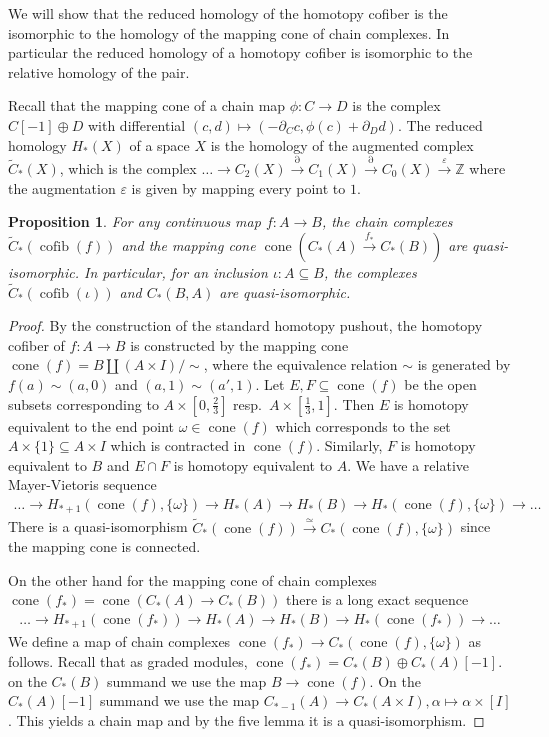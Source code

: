 \documentclass{scrartcl}
\theoremstyle{plain}
\newtheorem{proposition}[theorem]{Proposition}
\theoremstyle{definition}
\newcommand{\Z}{\mathbb Z}
\renewcommand{\epsilon}{\varepsilon}
\renewcommand{\subset}{\subseteq}
\newcommand{\isect}{\mathbin{\cap}}
\DeclareMathOperator{\cone}{cone}
\DeclareMathOperator{\cofib}{cofib}
\newcommand{\quiso}{\simeq}
\let\xto\xrightarrow
\renewcommand{\coprod}{\mathbin{\amalg}}
\begin{document}
We will show that the reduced homology of the homotopy cofiber is the isomorphic to the homology of the mapping cone of chain complexes. In particular the reduced homology of a homotopy cofiber is isomorphic to the relative homology of the pair.

Recall that the mapping cone of a chain map $\phi\colon C\to D$ is the complex $C[-1]\oplus D$ with differential $(c, d)\mapsto (-\partial_C c, \phi(c) + \partial_D d)$. The reduced homology $H_*(X)$ of a space $X$ is the homology of the augmented complex $\tilde C_*(X)$, which is the complex $\dots\to C_2(X)\xto{\partial} C_1(X)\xto{\partial} C_0(X)\xto{\epsilon} \Z$ where the augmentation $\epsilon$ is given by mapping every point to $1$. 
\begin{proposition}\label{prop:relative-homology-cofiber}
    For any continuous map $f\colon A\to B$, the chain complexes $\tilde C_*(\cofib(f))$ and the mapping cone $\cone(C_*(A)\xto{f_*} C_*(B))$ are quasi-isomorphic. In particular, for an inclusion $\iota \colon A\subset B$, the complexes $\tilde C_*(\cofib(\iota))$ and $C_*(B, A)$ are quasi-isomorphic. 
\end{proposition}
\begin{proof}
    By the construction of the standard homotopy pushout, the homotopy cofiber of $f\colon A\to B$ is constructed by the mapping cone $\cone(f) = B\coprod (A\times I) / \sim$, where the equivalence relation $\sim$ is generated by $f(a) \sim (a, 0)$ and $(a, 1)\sim (a', 1)$. Let $E, F\subset \cone(f)$ be the open subsets corresponding to $A\times [0, \frac 23]$ resp.\ $A\times [\frac 13, 1]$. Then $E$ is homotopy equivalent to the end point $\omega\in \cone(f)$ which corresponds to the set $A\times\{1\}\subset A\times I$ which is contracted in $\cone(f)$. Similarly, $F$ is homotopy equivalent to $B$ and $E\isect F$ is homotopy equivalent to $A$. We have a relative Mayer-Vietoris sequence
    \begin{align*}
        \dots\to H_{*+1}(\cone(f), \{\omega\}) \to H_*(A)\to H_*(B) \to H_*(\cone(f), \{\omega\})\to\dots
    \end{align*}
    There is a quasi-isomorphism $\tilde C_*(\cone(f)) \xto{\quiso} C_*(\cone(f), \{\omega\}) $ since the mapping cone is connected. 
    
    On the other hand for the mapping cone of chain complexes $\cone(f_*) = \cone(C_*(A)\to C_*(B))$ there is a long exact sequence 
    \begin{align*}
        \dots\to H_{*+1}(\cone(f_*)) \to H_*(A)\to H_*(B) \to H_*(\cone(f_*))\to\dots
    \end{align*}
    We define a map of chain complexes $\cone(f_*)\to C_*(\cone(f), \{\omega\})$ as follows. Recall that as graded modules, $\cone(f_*) = C_*(B)\oplus C_*(A)[-1]$. on the $C_*(B)$ summand we use the map $B\to \cone(f)$. On the $C_*(A)[-1]$ summand we use the map $C_{*-1}(A)\to C_{*}(A\times I), \alpha\mapsto\alpha\times[I]$. This yields a chain map and by the five lemma it is a quasi-isomorphism. 
\end{proof}
\end{document}
